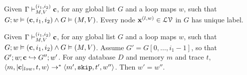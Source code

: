 \documentclass[a4paper,11pt]{article}
\begin{document}
\begin{lem}
Given $ \Gamma \vdash_{M,V}^{(i_1,i_2)} \mathbf{{c}}$, for any global list $G$ and a loop maps $w$, such that $G ;w \vDash (\mathbf{{c}}, i_1, i_2) \land G \vDash (M,V)$. Every node $\mathbf{{x}}^{(l,w)} \in \mathcal{LV}$ in $G$ has unique label.
\end{lem}

\begin{lem}\label{lem:samew}
Given $ \Gamma \vdash_{M,V}^{(i_1,i_2)} \mathbf{{c}}$, for any global list $G$ and a loop maps $w$, such that $G ;w \vDash (\mathbf{{c}}, i_1, i_2) \land G \vDash (M,V)$. 
Assume $G' = G[0, \ldots,i_1-1]$, so that $G';w ;\mathbf{{c}} \hookrightarrow G'' ; w'$. For any database $D$ and memory $m$ and trace $t$,  $\langle m, |\mathbf{{c}}|_{low}, t, w \rangle \to^{*} \langle m', \mathtt{skip}, t', w'' \rangle$. Then $w' = w''$.  
\end{lem}
\end{document}
